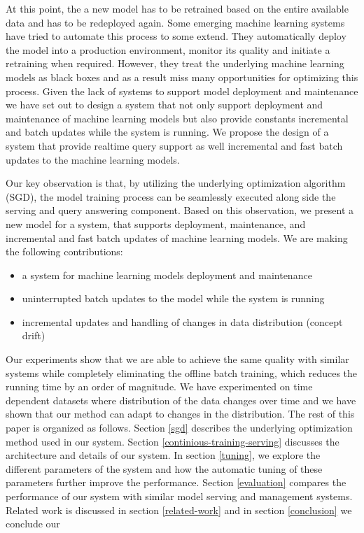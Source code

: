 \documentclass{sig-alternate-05-2015}
\begin{document}
At this point, the a new model has to be retrained based on the entire available data and has to be redeployed again.
Some emerging machine learning systems have tried to automate this process to some extend.
They automatically deploy the model into a production environment, monitor its quality and initiate a retraining when required.
However, they treat the underlying machine learning models as black boxes and as a result miss many opportunities for optimizing this process.
Given the lack of systems to support model deployment and maintenance we have set out to design a system that not only support deployment and maintenance of machine learning models but also provide constants incremental and batch updates while the system is running. 
We propose the design of a system that provide realtime query support as well incremental and fast batch updates to the machine learning models.

Our key observation is that, by utilizing the underlying optimization algorithm (SGD), the model training process can be seamlessly executed along side the serving and query answering component.
Based on this observation, we present a new model for a system, that supports deployment, maintenance, and incremental and fast batch updates of machine learning models.
We are making the following contributions: 
\begin{itemize}
\item a system for machine learning models deployment and maintenance
\item uninterrupted batch updates to the model while the system is running
\item incremental updates and handling of changes in data distribution (concept drift) 
\end{itemize}
Our experiments show that we are able to achieve the same quality with similar systems while completely eliminating the offline batch training, which reduces the running time by an order of magnitude. 
We have experimented on time dependent datasets where distribution of the data changes over time and we have shown that our method can adapt to changes in the distribution.
The rest of this paper is organized as follows. 
Section \ref{sgd} describes the underlying optimization method used in our system. 
Section \ref{continious-training-serving} discusses the architecture and details of our system. 
In section \ref{tuning}, we explore the different parameters of the system and how the automatic tuning of these parameters further improve the performance.
Section \ref{evaluation} compares the performance of our system with similar model serving and management systems. 
Related work is discussed in section \ref{related-work} and in section \ref{conclusion} we conclude our 
\end{document}
